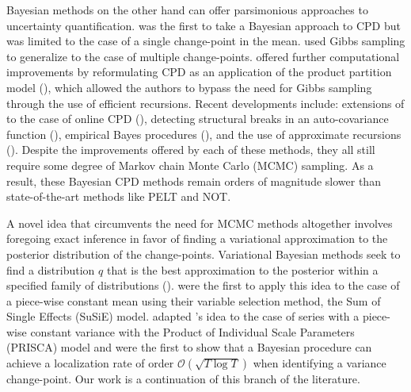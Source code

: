 Bayesian methods on the other hand can offer parsimonious approaches to uncertainty quantification. \cite{Smith75} was the first to take a Bayesian approach to CPD but was limited to the case of a single change-point in the mean. \cite{Stephens94} used Gibbs sampling to generalize to the case of multiple change-points. \cite{Barry93} offered further computational improvements by reformulating CPD as an application of the product partition model (\citealp{Hartigan90, Barry92}), which allowed the authors to bypass the need for Gibbs sampling through the use of efficient recursions. Recent developments include: extensions of \cite{Barry93} to the case of online CPD (\citealp{Fearnhead06, Adams07}), detecting structural breaks in an auto-covariance function (\citealp{Preuss15}), empirical Bayes procedures (\citealp{Liu17}), and the use of approximate recursions (\citealp{Cappello21}). Despite the improvements offered by each of these methods, they all still require some degree of Markov chain Monte Carlo (MCMC) sampling. As a result, these Bayesian CPD methods remain orders of magnitude slower than state-of-the-art methods like PELT and NOT.

A novel idea that circumvents the need for MCMC methods altogether involves foregoing exact inference in favor of finding a variational approximation to the posterior distribution of the change-points. Variational Bayesian methods seek to find a distribution $q$ that is the best approximation to the posterior within a specified family of distributions (\citealp{Jordan99, Bishop06, Wainwright08, Blei17}). \cite{Wang20} were the first to apply this idea to the case of a piece-wise constant mean using their variable selection method, the Sum of Single Effects (SuSiE) model. \cite{Cappello22} adapted \citeauthor{Wang20}'s idea to the case of series with a piece-wise constant variance with the Product of Individual Scale Parameters (PRISCA) model and were the first to show that a Bayesian procedure can achieve a localization rate of order $\mathcal{O}(\sqrt{T\log T})$ when identifying a variance change-point. Our work is a continuation of this branch of the literature.

